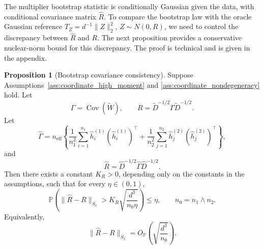 \documentclass[
  12pt]{article}
\theoremstyle{plain}
\theoremstyle{definition}
\newtheorem{proposition}{Proposition}[section]
\theoremstyle{remark}
\begin{document}
The multiplier bootstrap statistic is conditionally Gaussian given the data,
with conditional covariance matrix \(\widehat R\). To compare the bootstrap law
with the oracle Gaussian reference \(T_Z=d^{-1}\|Z\|_2^2\), \(Z\sim N(0,R)\),
we need to control the discrepancy between \(\widehat R\) and \(R\). The next
proposition provides a conservative nuclear-norm bound for this discrepancy.
The proof is technical and is given in the appendix.

\begin{proposition}[Bootstrap covariance consistency]
\label{prop:bootstrap_covariance_consistency}
Suppose Assumptions~\ref{ass:coordinate_high_moment} and
\ref{ass:coordinate_nondegeneracy} hold. Let
\[
\Gamma=\operatorname{Cov}(\widetilde W),
\qquad
R=\widetilde D^{-1/2}\Gamma\widetilde D^{-1/2}.
\]
Let
\[
\widehat\Gamma
=
n_{\mathrm{eff}}
\left\{
\frac1{n_1^2}\sum_{i=1}^{n_1}
\widehat h_i^{(1)}(\widehat h_i^{(1)})^\top
+
\frac1{n_2^2}\sum_{j=1}^{n_2}
\widehat h_j^{(2)}(\widehat h_j^{(2)})^\top
\right\},
\]
and
\[
\widehat R
=
\widehat D^{-1/2}\widehat\Gamma\widehat D^{-1/2}.
\]
Then there exists a constant \(K_R>0\), depending only on the constants in
the assumptions, such that for every \(\eta\in(0,1)\),
\[
\mathbb P
\left(
\|\widehat R-R\|_{S_1}
>
K_R\sqrt{\frac{d^3}{n_0\eta}}
\right)
\le \eta,
\qquad
n_0=n_1\wedge n_2.
\]
Equivalently,
\[
\|\widehat R-R\|_{S_1}
=
O_{\mathbb P}
\left(
\sqrt{\frac{d^3}{n_0}}
\right).
\]
\end{proposition}
\end{document}
